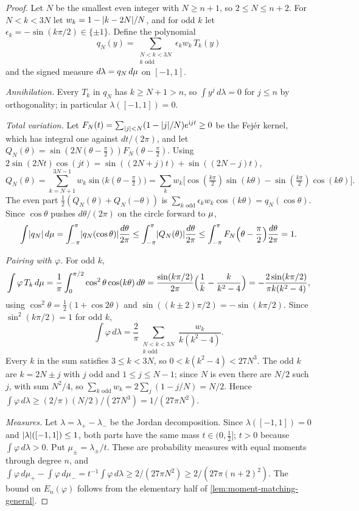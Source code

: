 \begin{proof}
Let $N$ be the smallest even integer with $N\ge n+1$, so $2\le N\le n+2$.
For $N<k<3N$ let $w_k=1-\lvert k-2N\rvert/N$, and for odd $k$ let
$\epsilon_k=-\sin(k\pi/2)\in\{\pm1\}$. Define the polynomial
\[
  q_N(y)=\sum_{\substack{N<k<3N\\k\text{ odd}}}\epsilon_kw_k\,T_k(y)
\]
and the signed measure $d\lambda=q_N\,d\mu$ on $[-1,1]$.

\emph{Annihilation.} Every $T_k$ in $q_N$ has $k\ge N+1>n$, so
$\int y^j\,d\lambda=0$ for $j\le n$ by orthogonality; in particular
$\lambda([-1,1])=0$.

\emph{Total variation.} Let $F_N(t)=\sum_{\lvert j\rvert<N}(1-\lvert j\rvert/N)e^{\mathrm{i}jt}
\ge0$ be the Fejér kernel, which has integral one against $dt/(2\pi)$, and
let $Q_N(\theta)=\sin(2N(\theta-\frac\pi2))F_N(\theta-\frac\pi2)$. Using
$2\sin(2Nt)\cos(jt)=\sin((2N+j)t)+\sin((2N-j)t)$,
\[
  Q_N(\theta)=\sum_{k=N+1}^{3N-1}w_k\sin\bigl(k(\theta-\tfrac\pi2)\bigr)
  =\sum_kw_k\bigl[\cos(\tfrac{k\pi}2)\sin(k\theta)-\sin(\tfrac{k\pi}2)
  \cos(k\theta)\bigr].
\]
The even part $\frac12(Q_N(\theta)+Q_N(-\theta))$ is
$\sum_{k\text{ odd}}\epsilon_kw_k\cos(k\theta)=q_N(\cos\theta)$. Since
$\cos\theta$ pushes $d\theta/(2\pi)$ on the circle forward to $\mu$,
\[
  \int\lvert q_N\rvert\,d\mu=\int_{-\pi}^{\pi}\lvert q_N(\cos\theta)\rvert
  \frac{d\theta}{2\pi}\le\int_{-\pi}^{\pi}\lvert Q_N(\theta)\rvert\frac{d\theta}{2\pi}
  \le\int_{-\pi}^{\pi}F_N\Bigl(\theta-\frac\pi2\Bigr)\frac{d\theta}{2\pi}=1.
\]

\emph{Pairing with $\varphi$.} For odd $k$,
\[
  \int\varphi\,T_k\,d\mu=\frac1\pi\int_0^{\pi/2}\cos^2\theta\cos(k\theta)
  \,d\theta=\frac{\sin(k\pi/2)}{2\pi}\Bigl(\frac1k-\frac{k}{k^2-4}\Bigr)
  =-\frac{2\sin(k\pi/2)}{\pi k(k^2-4)},
\]
using $\cos^2\theta=\frac12(1+\cos2\theta)$ and
$\sin((k\pm2)\pi/2)=-\sin(k\pi/2)$. Since $\sin^2(k\pi/2)=1$ for odd $k$,
\[
  \int\varphi\,d\lambda=\frac2\pi\sum_{\substack{N<k<3N\\k\text{ odd}}}
  \frac{w_k}{k(k^2-4)}.
\]
Every $k$ in the sum satisfies $3\le k<3N$, so $0<k(k^2-4)<27N^3$. The odd
$k$ are $k=2N\pm j$ with $j$ odd and $1\le j\le N-1$; since $N$ is even
there are $N/2$ such $j$, with sum $N^2/4$, so
$\sum_{k\text{ odd}}w_k=2\sum_j(1-j/N)=N/2$. Hence
$\int\varphi\,d\lambda\ge(2/\pi)(N/2)/(27N^3)=1/(27\pi N^2)$.

\emph{Measures.} Let $\lambda=\lambda_+-\lambda_-$ be the Jordan
decomposition. Since $\lambda([-1,1])=0$ and $\lvert \lambda\rvert([-1,1])\le1$,
both parts have the same mass $t\in(0,\frac12]$; $t>0$ because
$\int\varphi\,d\lambda>0$. Put $\mu_\pm=\lambda_\pm/t$. These are
probability measures with equal moments through degree $n$, and
$\int\varphi\,d\mu_+-\int\varphi\,d\mu_-=t^{-1}\int\varphi\,d\lambda\ge
2/(27\pi N^2)\ge2/(27\pi(n+2)^2)$. The bound on $E_n(\varphi)$ follows from
the elementary half of \cref{lem:moment-matching-general}.
\end{proof}

